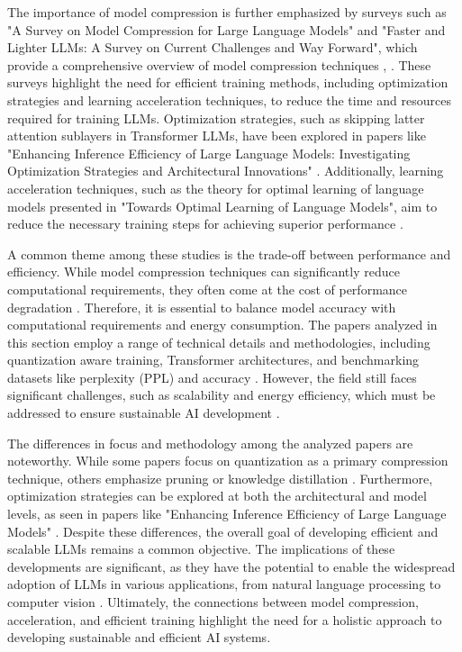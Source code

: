 \documentclass[conference]{IEEEtran}
\begin{document}
The importance of model compression is further emphasized by surveys such as "A Survey on Model Compression for Large Language Models" and "Faster and Lighter LLMs: A Survey on Current Challenges and Way Forward", which provide a comprehensive overview of model compression techniques \cite{b5}, \cite{b6}. These surveys highlight the need for efficient training methods, including optimization strategies and learning acceleration techniques, to reduce the time and resources required for training LLMs. Optimization strategies, such as skipping latter attention sublayers in Transformer LLMs, have been explored in papers like "Enhancing Inference Efficiency of Large Language Models: Investigating Optimization Strategies and Architectural Innovations" \cite{b7}. Additionally, learning acceleration techniques, such as the theory for optimal learning of language models presented in "Towards Optimal Learning of Language Models", aim to reduce the necessary training steps for achieving superior performance \cite{b8}.

A common theme among these studies is the trade-off between performance and efficiency. While model compression techniques can significantly reduce computational requirements, they often come at the cost of performance degradation \cite{b9}. Therefore, it is essential to balance model accuracy with computational requirements and energy consumption. The papers analyzed in this section employ a range of technical details and methodologies, including quantization aware training, Transformer architectures, and benchmarking datasets like perplexity (PPL) and accuracy \cite{b10}. However, the field still faces significant challenges, such as scalability and energy efficiency, which must be addressed to ensure sustainable AI development \cite{b11}.

The differences in focus and methodology among the analyzed papers are noteworthy. While some papers focus on quantization as a primary compression technique, others emphasize pruning or knowledge distillation \cite{b12}. Furthermore, optimization strategies can be explored at both the architectural and model levels, as seen in papers like "Enhancing Inference Efficiency of Large Language Models" \cite{b7}. Despite these differences, the overall goal of developing efficient and scalable LLMs remains a common objective. The implications of these developments are significant, as they have the potential to enable the widespread adoption of LLMs in various applications, from natural language processing to computer vision \cite{b13}. Ultimately, the connections between model compression, acceleration, and efficient training highlight the need for a holistic approach to developing sustainable and efficient AI systems.
\end{document}
